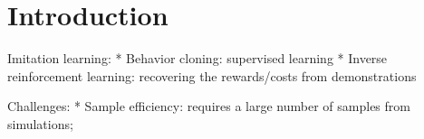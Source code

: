 \section{Introduction}
Imitation learning: 
* Behavior cloning: supervised learning
* Inverse reinforcement learning: recovering the rewards/costs from demonstrations


Challenges: 
* Sample efficiency: requires a large number of samples from simulations; 